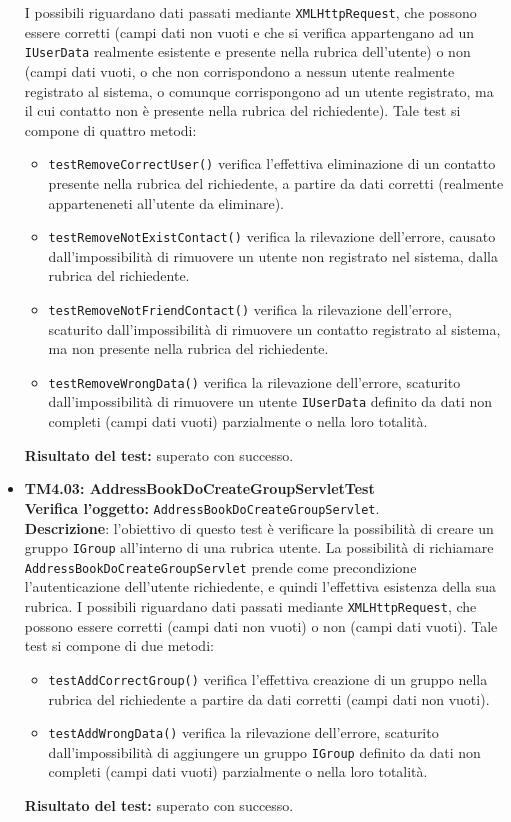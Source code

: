 \begin{itemize}
I possibili  riguardano dati passati mediante \texttt{XMLHttpRequest}, che possono essere corretti (campi dati non vuoti e che si verifica appartengano ad un \texttt{IUserData} realmente esistente e presente nella rubrica dell'utente) o non (campi dati vuoti, o che non corrispondono a nessun utente realmente registrato al sistema, o comunque corrispongono ad un utente registrato, ma il cui contatto non è presente nella rubrica del richiedente).
Tale test si compone di quattro metodi:
\begin{itemize}
\item \texttt{testRemoveCorrectUser()} verifica l'effettiva eliminazione di un contatto presente nella rubrica del richiedente, a partire da dati corretti (realmente apparteneneti all'utente da eliminare).
\item \texttt{testRemoveNotExistContact()} verifica la rilevazione dell'errore, causato dall'impossibilità di rimuovere un utente non registrato nel sistema, dalla rubrica del richiedente.
\item \texttt{testRemoveNotFriendContact()} verifica la rilevazione dell'errore, scaturito dall'impossibilità di rimuovere un contatto registrato al sistema, ma non presente nella rubrica del richiedente. 
\item \texttt{testRemoveWrongData()} verifica la rilevazione dell'errore, scaturito dall'impossibilità di rimuovere un utente \texttt{IUserData} definito da dati non completi (campi dati vuoti) parzialmente o nella loro totalità.
\end{itemize}
\textbf{Risultato del test:} superato con successo.

\item \textbf{TM4.03: AddressBookDoCreateGroupServletTest}\\
\textbf{Verifica l'oggetto:} \texttt{AddressBookDoCreateGroupServlet}.\\
\textbf{Descrizione}: l'obiettivo di questo test è verificare la possibilità di creare un gruppo \texttt{IGroup} all'interno di una rubrica utente. La possibilità di richiamare \texttt{AddressBookDoCreateGroupServlet} prende come precondizione l'autenticazione dell'utente richiedente, e quindi l'effettiva esistenza della sua rubrica. I possibili  riguardano dati passati mediante \texttt{XMLHttpRequest}, che possono essere corretti (campi dati non vuoti) o non (campi dati vuoti).
Tale test si compone di due metodi:
\begin{itemize}
\item \texttt{testAddCorrectGroup()} verifica l'effettiva creazione di un gruppo nella rubrica del richiedente a partire da dati corretti (campi dati non vuoti).
\item \texttt{testAddWrongData()} verifica la rilevazione dell'errore, scaturito dall'impossibilità di aggiungere un gruppo \texttt{IGroup} definito da dati non completi (campi dati vuoti) parzialmente o nella loro totalità.
\end{itemize}
\textbf{Risultato del test:} superato con successo.


\end{itemize}
